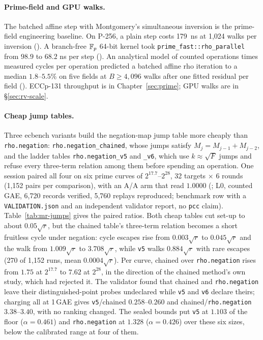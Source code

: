 \paragraph{Prime-field and GPU walks.} The batched affine step with
Montgomery's simultaneous inversion is the prime-field engineering baseline.
On P-256, a plain step costs 179~ns at 1{,}024 walks per inversion
(). A branch-free $\mathbb{F}_p$ 64-bit
kernel took \texttt{prime\_fast::rho\_parallel} from $98.9$ to $68.2$ ns per
step (). An analytical model of
counted operations times measured cycles per operation predicted a batched
affine rho iteration to a median $1.8$--$5.5\%$ on five fields at
$B\ge4{,}096$ walks after one fitted residual per field
(). ECCp-131 throughput is in
Chapter~\ref{sec:prime}; GPU walks are in \S\ref{sec:rv-scale}.

\paragraph{Cheap jump tables.} Three ecbench variants build the
negation-map jump table more cheaply than \texttt{rho.negation}:
\texttt{rho.negation\_chained}, whose jumps satisfy
$M_j=M_{j-1}+M_{j-2}$, and the ladder tables \texttt{rho.negation\_v5} and
\texttt{\_v6}, which use $k\approx\sqrt F$ jumps and refuse every
three-term relation among them before spending an operation. One session
paired all four on six prime curves of $2^{17.7}$--$2^{28}$, 32 targets
$\times$ 6 rounds (1{,}152 pairs per comparison), with an A/A arm that read
$1.0000$ (; L0, counted
GAE, 6{,}720 records verified, 5{,}760 replays reproduced; benchmark row with
a \texttt{VALIDATION.json} and an independent validator report, no
\texttt{pcc} claim). Table~\ref{tab:mr-jumps} gives the paired ratios. Both
cheap tables cut set-up to about $0.05\sqrt r$, but the chained table's
three-term relation becomes a short fruitless cycle under negation: cycle
escapes rise from $0.003\sqrt r$ to $0.045\sqrt r$ and the walk from
$1.009\sqrt r$ to $3.708\sqrt r$, while \texttt{v5} walks $0.884\sqrt r$
with rare escapes (270 of 1{,}152 runs, mean $0.0004\sqrt r$). Per curve,
chained over \texttt{rho.negation} rises from $1.75$ at $2^{17.7}$ to $7.62$
at $2^{28}$, in the direction of the chained method's own study, which had
rejected it. The validator found that chained and \texttt{rho.negation}
leave their distinguished-point probes undeclared while \texttt{v5} and
\texttt{v6} declare theirs; charging all at 1\,GAE gives \texttt{v5}/chained
$0.258$--$0.260$ and chained/\texttt{rho.negation} $3.38$--$3.40$, with no
ranking changed. The sealed bounds put \texttt{v5} at $1.103$ of the floor
($\alpha=0.461$) and \texttt{rho.negation} at $1.328$ ($\alpha=0.426$) over
these six sizes, below the calibrated range at four of them.

